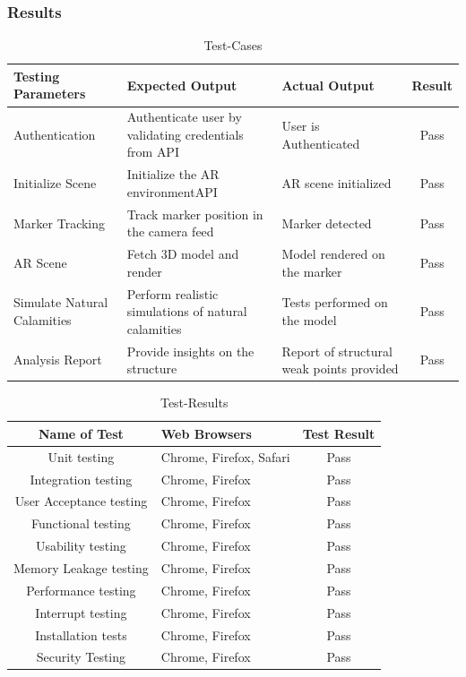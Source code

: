 \documentclass[BTech]{srmuthesis}
\begin{document}
\subsubsection{Results}
\begin{table}[htbp]
	\centering
\begin{tabular}{|L|L|L|c|}

	\hline
	Testing Parameters & Expected Output  & Actual Output &Result\\
	\hline
		\hline
	Authentication & Authenticate user by validating credentials from \ac{API} & User is Authenticated &Pass\\
		\hline
	Initialize Scene & Initialize the AR environment\ac{API} & AR scene initialized &Pass\\
		\hline
	Marker Tracking & Track marker position in the camera feed & Marker detected &Pass\\
		\hline
	AR Scene &  Fetch 3D model and render & Model rendered on the marker & Pass\\
		\hline
	Simulate Natural Calamities & Perform realistic simulations of natural calamities & Tests performed on the model &Pass\\
		\hline
	Analysis Report & Provide insights on the structure& Report of structural weak points provided &Pass\\
		\hline

\end{tabular}
\caption{Test-Cases}
\label{tab:test-cases}
  \end{table}
\begin{table}[htbp]
	\centering
\begin{tabular}{|c|L|c|}
	\hline
	Name of Test & Web Browsers & Test Result\\
	\hline
		\hline
	Unit testing & Chrome, Firefox, Safari & Pass\\
		\hline
	Integration testing & Chrome, Firefox & Pass\\
		\hline
	User Acceptance testing & Chrome, Firefox & Pass\\
		\hline
	Functional testing & Chrome, Firefox & Pass\\
		\hline
	Usability testing & Chrome, Firefox & Pass \\
		\hline
	Memory Leakage testing & Chrome, Firefox & Pass\\
		\hline
	Performance testing   & Chrome, Firefox & Pass\\
		\hline
	Interrupt testing & Chrome, Firefox & Pass\\
		\hline
	Installation tests & Chrome, Firefox & Pass\\
		\hline
	Security Testing & Chrome, Firefox& Pass\\
	
	\hline
\end{tabular}
\caption{Test-Results}
\label{tab:test-results}
\end{table}
\end{document}
